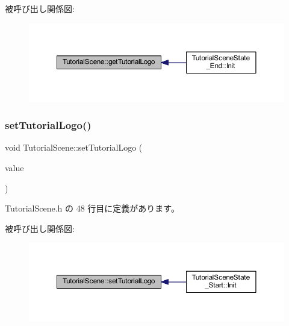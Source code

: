 被呼び出し関係図\+:
\nopagebreak
\begin{figure}[H]
\begin{center}
\leavevmode
\includegraphics[width=350pt]{class_tutorial_scene_a2038b4fe667b7a69080a8c9c752f7fb9_icgraph}
\end{center}
\end{figure}
\mbox{\label{class_tutorial_scene_a7c8b448ac848d4811e448acf45c5a48e}} 
\subsubsection{\texorpdfstring{set\+Tutorial\+Logo()}{setTutorialLogo()}}
{\footnotesize\ttfamily void Tutorial\+Scene\+::set\+Tutorial\+Logo (\begin{DoxyParamCaption}\item[{\mbox{\hyperlink{class_tutorial_logo}{Tutorial\+Logo}} $\ast$}]{value }\end{DoxyParamCaption})\hspace{0.3cm}{\ttfamily [inline]}}



 Tutorial\+Scene.\+h の 48 行目に定義があります。

被呼び出し関係図\+:
\nopagebreak
\begin{figure}[H]
\begin{center}
\leavevmode
\includegraphics[width=350pt]{class_tutorial_scene_a7c8b448ac848d4811e448acf45c5a48e_icgraph}
\end{center}
\end{figure}


